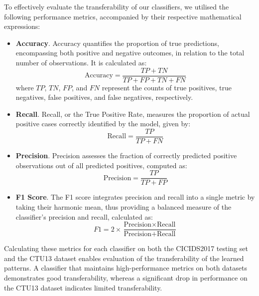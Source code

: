 To effectively evaluate the transferability of our classifiers, we utilised the following performance metrics, accompanied by their respective mathematical expressions:

\begin{itemize}
    \item \textbf{Accuracy}. Accuracy quantifies the proportion of true predictions, encompassing both positive and negative outcomes, in relation to the total number of observations. It is calculated as:
    \begin{equation}
    \text{Accuracy} = \frac{TP + TN}{TP + FP + TN + FN}
    \end{equation}
    where $TP$, $TN$, $FP$, and $FN$ represent the counts of true positives, true negatives, false positives, and false negatives, respectively.
    
    \item \textbf{Recall}. Recall, or the True Positive Rate, measures the proportion of actual positive cases correctly identified by the model, given by:
    \begin{equation}
    \text{Recall} = \frac{TP}{TP + FN}
    \end{equation}
    
    \item \textbf{Precision}. Precision assesses the fraction of correctly predicted positive observations out of all predicted positives, computed as:
    \begin{equation}
    \text{Precision} = \frac{TP}{TP + FP}
    \end{equation}
    
    \item \textbf{F1 Score}. The F1 score integrates precision and recall into a single metric by taking their harmonic mean, thus providing a balanced measure of the classifier's precision and recall, calculated as:
    \begin{equation}
    F1 = 2 \times \frac{\text{Precision} \times \text{Recall}}{\text{Precision} + \text{Recall}}
    \end{equation}
\end{itemize}

Calculating these metrics for each classifier on both the CICIDS2017 testing set and the CTU13 dataset enables evaluation of the transferability of the learned patterns. A classifier that maintains high-performance metrics on both datasets demonstrates good transferability, whereas a significant drop in performance on the CTU13 dataset indicates limited transferability.

